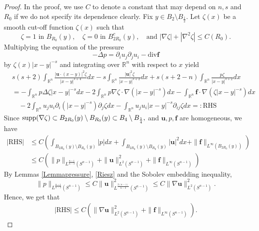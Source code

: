 \documentclass[12pt]{amsart}
\newcommand{\Bu}{{\boldsymbol{u}}}
\newcommand{\Bf}{{\boldsymbol{f}}}
\begin{document}
{		\begin{proof}
			In the proof, we use $C$ to denote a constant that may depend on $n,s$ and $R_0$ if we do not specify its dependence clearly.
			Fix $y\in B_2\setminus B_{\frac12}$. Let  $\zeta(x)$ be a smooth cut-off function $\zeta(x)$ such that
			$$ \zeta=1 \text{ in } B_{R_{0}}(y), \quad \zeta=0 \text{ in } B_{2R_{0}}^{c}(y), \quad\text{and}\,\, |\nabla\zeta|+|\nabla^{2}\zeta|\le C(R_0). $$
			Multiplying the equation of the pressure 
			\begin{equation}\label{eq:pressure}
				-\Delta p=\partial_{i}u_{j}\partial_{j}u_{i}-\text{div}\Bf
			\end{equation}
			by $\zeta (x) |x-y|^{-s}$ and integrating over $\mathbb{R}^n$ with respect to $x$ yield
			\begin{align}\label{eq:weightedestforp}
				& s(s+2)\int_{\mathbb{R}^{n}}\frac{|\Bu\cdot(x-y)|^{2}\zeta}{|x-y|^{s+4}} dx -s\int_{\mathbb{R}^{n}}\frac{|\Bu|^{2}\zeta}{|x-y|^{s+2}} dx +s(s+2-n) \int_{\mathbb{R}^{n}}\frac{p\zeta}{|x-y|^{s+2}}dx  \nonumber \\
				&=-\int_{\mathbb{R}^{n}}p\Delta\zeta|x-y|^{-s} dx -2\int_{\mathbb{R}^{n}}p\nabla\zeta\cdot\nabla(|x-y|^{-s})dx -\int_{\mathbb{R}^{n}}\Bf \cdot\nabla(\zeta|x-y|^{-s})dx  \nonumber \\
				&\quad -2\int_{\mathbb{R}^{n}}u_{j}u_{i}\partial_{i}(|x-y|^{-s})\partial_{j}\zeta dx -\int_{\mathbb{R}^{n}}u_{j}u_{i}|x-y|^{-s}\partial_{ij}\zeta dx =:\text{RHS}
			\end{align}
			Since  $\textnormal{supp}(\nabla\zeta)\subset B_{2R_{0}}(y)\setminus B_{R_0}(y)\subset B_4\setminus B_{\frac14},$ and  $\Bu, p, \Bf$ are homogeneous,  we have
			\begin{align*}
				|\text{RHS}| & \leq C \left( \int_{B_{2R_{0}}(y)\setminus B_{R_0}(y)}|p|dx  + \int_{B_{2R_{0}}(y)\setminus B_{R_0}(y)}|\Bu|^{2}dx+\|\Bf\|_{L^{\infty}(B_{2R_{0}}(y))}\right) \\
				&\leq C\left(\|p\|_{L^{\frac{n-1}{n-3}}(S^{n-1}) }+\|\Bu\|_{L^2(S^{n-1}) }^2+\|\Bf\|_{L^{\infty}(S^{n-1})}\right) 
			\end{align*}
			By Lemmas \ref{Lemmapressure}, \ref{Riesz} and the Sobolev embedding inequality,
			\begin{equation*}
				\|p\|_{L^{\frac{n-1}{n-3}}(S^{n-1})} \leq C \|\Bu\|_{L^{\frac{2(n-1)}{n-3}}(S^{n-1})}^2 \leq C \|\nabla \Bu\|_{L^2(S^{n-1})}^2. 
			\end{equation*}
			Hence, we get that 
			\begin{align*}
				|\text{RHS}| \leq  C \left( \|\nabla \Bu\|_{L^2(S^{n-1}) }^2+\|\Bf\|_{L^{\infty}(S^{n-1})} \right).

\end{align*}
\end{proof}}
\end{document}
